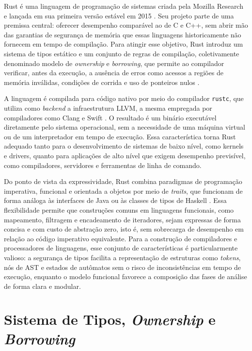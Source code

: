 \documentclass[
    12pt
    ,oneside
    ,a4paper
    ,chapter=TITLE
    ,section=TITLE
    ,sumario=abnt-6027-2012]{abntex2}
\begin{document}
Rust é uma linguagem de programação de sistemas criada pela Mozilla Research e lançada em sua
primeira versão estável em 2015 \cite{klabnik2019}. Seu projeto parte de uma premissa central:
oferecer desempenho comparável ao de C e C++, sem abrir mão das garantias de segurança de
memória que essas linguagens historicamente não fornecem em tempo de compilação. Para atingir
esse objetivo, Rust introduz um sistema de tipos estático e um conjunto de regras de compilação,
coletivamente denominado modelo de \textit{ownership} e \textit{borrowing}, que permite ao
compilador verificar, antes da execução, a ausência de erros como acessos a regiões de memória
inválidas, condições de corrida e uso de ponteiros nulos \cite{klabnik2019}.

A linguagem é compilada para código nativo por meio do compilador \texttt{rustc}, que utiliza
como \textit{backend} a infraestrutura LLVM, a mesma empregada por compiladores como Clang e
Swift \cite{klabnik2019}. O resultado é um binário executável diretamente pelo sistema
operacional, sem a necessidade de uma máquina virtual ou de um interpretador em tempo de
execução. Essa característica torna Rust adequado tanto para o desenvolvimento de sistemas de
baixo nível, como kernels e drivers, quanto para aplicações de alto nível que exigem desempenho
previsível, como compiladores, servidores e ferramentas de linha de comando.

Do ponto de vista da expressividade, Rust combina paradigmas de programação imperativa,
funcional e orientada a objetos por meio de \textit{traits}, que funcionam de forma análoga às
interfaces de Java ou às classes de tipos de Haskell \cite{klabnik2019}. Essa flexibilidade
permite que construções comuns em linguagens funcionais, como mapeamento, filtragem e
encadeamento de iteradores, sejam expressas de forma concisa e com custo de abstração zero,
isto é, sem sobrecarga de desempenho em relação ao código imperativo equivalente. Para a
construção de compiladores e processadores de linguagens, esse conjunto de características é
particularmente valioso: a segurança de tipos facilita a representação de estruturas como
\textit{tokens}, nós de AST e estados de autômatos sem o risco de inconsistências em tempo de execução,
enquanto o modelo funcional favorece a composição das fases de análise de forma clara e
modular.

\section{Sistema de Tipos, \textit{Ownership} e \textit{Borrowing}}
\label{sec:rust-ownership}
\end{document}
